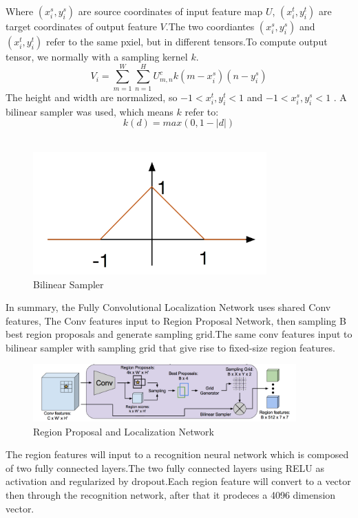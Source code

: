 \documentclass[12pt,a4paper]{report}
\begin{document}
Where $(x_i^s,y_i^s)$ are source coordinates of input feature map $U$, $(x_i^t,y_i^t)$ are target coordinates of output feature $V$.The two coordiantes $(x_i^s,y_i^s)$ and $(x_i^t,y_i^t)$ refer to the same pxiel, but in different tensors.To compute output tensor, we normally with a sampling kernel $k$.
\[V_i=\sum\limits_{m=1}^W\sum\limits_{n=1}^HU_{m,n}^c k(m-x_i^s)(n-y_i^s)\]
The height and width are normalized, so $-1<x_i^t,y_i^t<1$ and $-1<x_i^s,y_i^s<1$ . A bilinear sampler was used, which means $k$ refer to:
$$k(d)=max(0,1-|d|)$$\\
\begin{figure}[h]
\centering
\includegraphics[width=0.8\textwidth]{bilinear2.png}
\caption{Bilinear Sampler}
\end{figure}

In summary, the Fully Convolutional Localization Network uses  shared  Conv features, The Conv features input to Region Proposal Network, then sampling B best region proposals and generate sampling grid.The same conv features input to bilinear sampler with sampling grid that give rise to  fixed-size region features.

\begin{figure}[h]
\centering
\includegraphics[width=0.9\textwidth]{rpn.png}
\caption{Region Proposal and Localization Network}
\end{figure}

The region features will input to a recognition neural network which is composed of  two fully connected  layers.The two fully connected layers using RELU as activation and regularized by dropout.Each region feature will convert to a vector then through the recognition network, after that it prodeces a 4096 dimension vector. 
\end{document}
